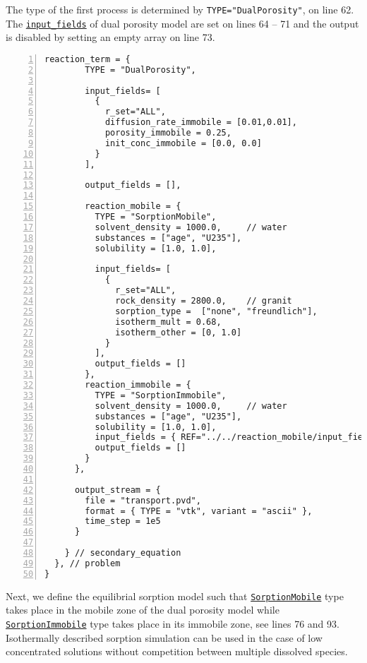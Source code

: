 The type of the first process is determined by {\tt TYPE="DualPorosity"}, on line 62. 
The \hyperlink{DualPorosity::input-fields::B}{\tt input\_fields}
of dual porosity model are set on lines 64 -- 71 and the output is disabled by setting an empty array on line 73.

\begin{Verbatim}[numbers=left, firstnumber=last]
      reaction_term = {
        TYPE = "DualPorosity",
        
        input_fields= [
          {
            r_set="ALL",
            diffusion_rate_immobile = [0.01,0.01],
            porosity_immobile = 0.25,
            init_conc_immobile = [0.0, 0.0]
          }
        ],
        
        output_fields = [],
        
        reaction_mobile = {
          TYPE = "SorptionMobile",
          solvent_density = 1000.0,     // water
          substances = ["age", "U235"],
          solubility = [1.0, 1.0],
          
          input_fields= [
            {
              r_set="ALL",
              rock_density = 2800.0,    // granit
              sorption_type =  ["none", "freundlich"],
              isotherm_mult = 0.68, 
              isotherm_other = [0, 1.0]
            }
          ],
          output_fields = []
        },
        reaction_immobile = {
          TYPE = "SorptionImmobile",
          solvent_density = 1000.0,     // water
          substances = ["age", "U235"],
          solubility = [1.0, 1.0],
          input_fields = { REF="../../reaction_mobile/input_fields" },
          output_fields = []
        }
      },
      
      output_stream = { 
        file = "transport.pvd", 
        format = { TYPE = "vtk", variant = "ascii" },
        time_step = 1e5      
      } 

    } // secondary_equation
  }, // problem
}
\end{Verbatim}

Next, we define the equilibrial sorption model such that \hyperlink{IT::SorptionMobile}{\tt SorptionMobile} type takes place in the mobile 
zone of the dual porosity model while \hyperlink{IT::SorptionImmobile}{\tt SorptionImmobile} type takes place in its immobile zone, see lines 76 and 93.
Isothermally described sorption simulation can be used in the case of low concentrated solutions without competition between multiple dissolved species.

